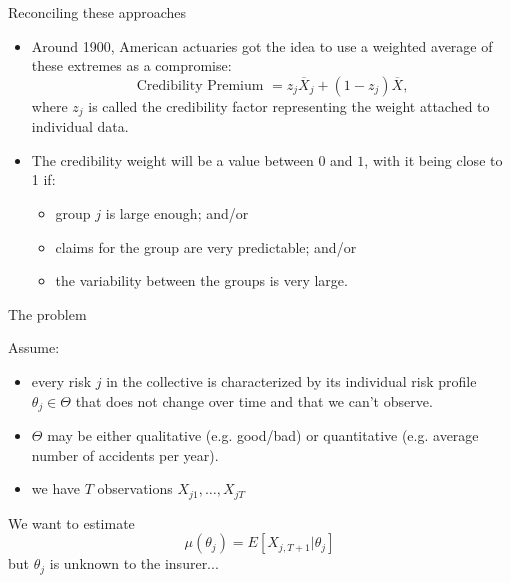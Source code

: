 \documentclass[11pt]{beamer}
\begin{document}
\begin{frame}{Reconciling these approaches} 
 
\begin{itemize}
 
\item Around 1900, American actuaries got the idea to use a weighted average of these extremes as a compromise:
$$\text{Credibility Premium }=z_{j}\overline{X}_{j}+\left(1-z_{j}\right) \overline{X}\text{,}$$
where $z_{j}$ is called the \alert{credibility factor} representing the weight attached to individual data.

\vfill


\item The credibility weight will be a value between $0$ and $1$, with it being close to 1 if:

\begin{itemize}
\item group $j$ is large enough; and/or

\item claims for the group are very predictable; and/or

\item the variability between the groups is very large.
\end{itemize}
\end{itemize}

\end{frame}
\begin{frame}{The problem}

Assume:
\begin{itemize}
\item every risk $j$ in the collective is characterized by its individual risk profile \alert{$\theta_j \in \Theta$} that does not change over time and that we can't observe.
\item $\Theta$ may be either qualitative (e.g. good/bad) or quantitative (e.g. average number of accidents per year).
\item we have $T$ observations $X_{j1},\ldots,X_{jT}$
\end{itemize}
We want to estimate
$$\mu(\theta_j)=E\left[X_{j,T+1}|\theta_j\right]$$
but $\theta_j$ is unknown to the insurer...

\end{frame}
\end{document}
